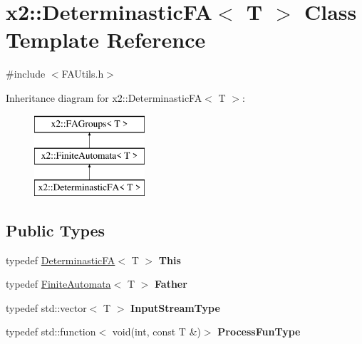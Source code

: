 \hypertarget{classx2_1_1_determinastic_f_a}{}\section{x2\+:\+:Determinastic\+FA$<$ T $>$ Class Template Reference}
\label{classx2_1_1_determinastic_f_a}


{\ttfamily \#include $<$F\+A\+Utils.\+h$>$}

Inheritance diagram for x2\+:\+:Determinastic\+FA$<$ T $>$\+:\begin{figure}[H]
\begin{center}
\leavevmode
\includegraphics[height=3.000000cm]{classx2_1_1_determinastic_f_a}
\end{center}
\end{figure}
\subsection*{Public Types}
\begin{DoxyCompactItemize}
\item 
\mbox{\label{classx2_1_1_determinastic_f_a_a378dc64bebafba6e061dfa0616f73713}} 
typedef \hyperlink{classx2_1_1_determinastic_f_a}{Determinastic\+FA}$<$ T $>$ {\bfseries This}
\item 
\mbox{\label{classx2_1_1_determinastic_f_a_a6ffacb3640a8d30ec12b6da8435a7026}} 
typedef \hyperlink{classx2_1_1_finite_automata}{Finite\+Automata}$<$ T $>$ {\bfseries Father}
\item 
\mbox{\label{classx2_1_1_determinastic_f_a_a71618ce7ece8a7d8e969dfba34a71d6a}} 
typedef std\+::vector$<$ T $>$ {\bfseries Input\+Stream\+Type}
\item 
\mbox{\label{classx2_1_1_determinastic_f_a_aca059798241ef9f91ec1e613b27790cc}} 
typedef std\+::function$<$ void(int, const T \&)$>$ {\bfseries Process\+Fun\+Type}
\end{DoxyCompactItemize}
